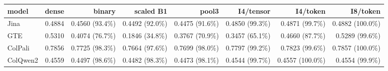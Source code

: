 \begin{tabular}{lrrrrrrr}
\toprule
model & dense & binary & scaled B1 & pool3 & I4/tensor & I4/token & I8/token \\
\midrule
Jina & 0.4884 & 0.4560 (93.4\%) & 0.4492 (92.0\%) & 0.4475 (91.6\%) & 0.4850 (99.3\%) & 0.4871 (99.7\%) & 0.4882 (100.0\%) \\
GTE & 0.5310 & 0.4074 (76.7\%) & 0.1846 (34.8\%) & 0.3767 (70.9\%) & 0.3457 (65.1\%) & 0.4660 (87.7\%) & 0.5289 (99.6\%) \\
ColPali & 0.7856 & 0.7725 (98.3\%) & 0.7664 (97.6\%) & 0.7699 (98.0\%) & 0.7797 (99.2\%) & 0.7823 (99.6\%) & 0.7857 (100.0\%) \\
ColQwen2 & 0.4559 & 0.4497 (98.6\%) & 0.4482 (98.3\%) & 0.4473 (98.1\%) & 0.4544 (99.7\%) & 0.4557 (100.0\%) & 0.4554 (99.9\%) \\
\bottomrule
\end{tabular}
